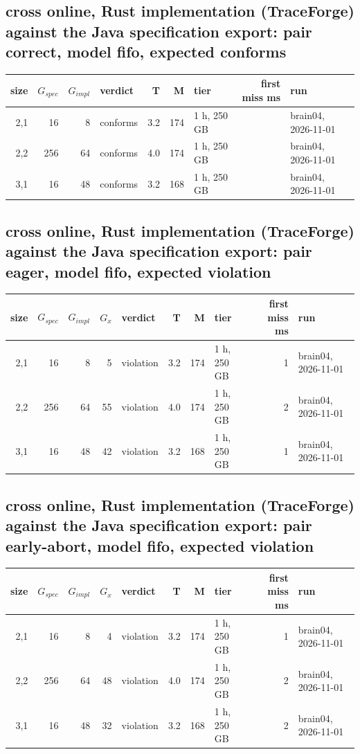 \documentclass[10pt]{article}
\begin{document}
\subsection*{cross online, Rust implementation (TraceForge) against the Java specification export: pair \textsf{correct}, model fifo, expected conforms}
\begin{longtable}{@{}rrrlrrlrl@{}}
\toprule
size & $G_{\mathit{spec}}$ & $G_{\mathit{impl}}$ & verdict & T & M & tier & first miss ms & run \\
\midrule
\endhead
\color{red} 2,1 & 16 & 8 & conforms & 3.2 & 174 & 1 h, 250 GB &  & brain04, 2026-11-01 \\
\color{red} 2,2 & 256 & 64 & conforms & 4.0 & 174 & 1 h, 250 GB &  & brain04, 2026-11-01 \\
\color{red} 3,1 & 16 & 48 & conforms & 3.2 & 168 & 1 h, 250 GB &  & brain04, 2026-11-01 \\
\bottomrule
\end{longtable}
\subsection*{cross online, Rust implementation (TraceForge) against the Java specification export: pair \textsf{eager}, model fifo, expected violation}
\begin{longtable}{@{}rrrrlrrlrl@{}}
\toprule
size & $G_{\mathit{spec}}$ & $G_{\mathit{impl}}$ & $G_x$ & verdict & T & M & tier & first miss ms & run \\
\midrule
\endhead
\color{red} 2,1 & 16 & 8 & 5 & violation & 3.2 & 174 & 1 h, 250 GB & 1 & brain04, 2026-11-01 \\
\color{red} 2,2 & 256 & 64 & 55 & violation & 4.0 & 174 & 1 h, 250 GB & 2 & brain04, 2026-11-01 \\
\color{red} 3,1 & 16 & 48 & 42 & violation & 3.2 & 168 & 1 h, 250 GB & 1 & brain04, 2026-11-01 \\
\bottomrule
\end{longtable}
\subsection*{cross online, Rust implementation (TraceForge) against the Java specification export: pair \textsf{early-abort}, model fifo, expected violation}
\begin{longtable}{@{}rrrrlrrlrl@{}}
\toprule
size & $G_{\mathit{spec}}$ & $G_{\mathit{impl}}$ & $G_x$ & verdict & T & M & tier & first miss ms & run \\
\midrule
\endhead
\color{red} 2,1 & 16 & 8 & 4 & violation & 3.2 & 174 & 1 h, 250 GB & 1 & brain04, 2026-11-01 \\
\color{red} 2,2 & 256 & 64 & 48 & violation & 4.0 & 174 & 1 h, 250 GB & 2 & brain04, 2026-11-01 \\
\color{red} 3,1 & 16 & 48 & 32 & violation & 3.2 & 168 & 1 h, 250 GB & 2 & brain04, 2026-11-01 \\
\bottomrule
\end{longtable}
\end{document}
